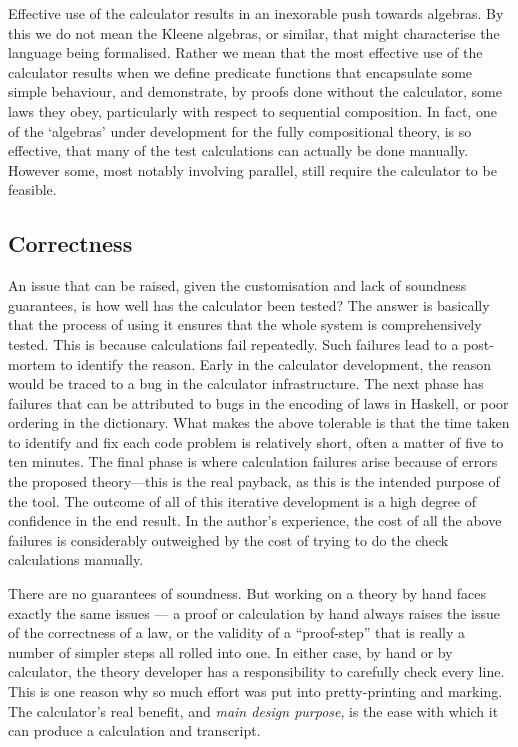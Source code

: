  


    Effective use of the calculator results in an inexorable
    push towards algebras. By this we do not mean the Kleene algebras,
    or similar, that might characterise the language being formalised.
    Rather we mean that the most effective use of the calculator results
    when we define predicate functions that encapsulate some simple
    behaviour, and demonstrate, by proofs done without the calculator,
    some laws they obey, 
    particularly with respect to sequential composition.
    In fact, one of the `algebras' under development for the fully
    compositional theory, is so effective, 
    that many of the test calculations
    can actually be done manually.
    However some, most notably involving parallel,
    still require the calculator to be feasible.

\subsection{Correctness}

    An issue that can be raised,
    given the customisation and lack of soundness guarantees,
    is how well has the calculator been tested?
    The answer is basically that the process of using it ensures
    that the whole system is comprehensively tested.
    This is because calculations fail repeatedly.
    Such failures lead to a post-mortem to identify the reason.
    Early in the calculator development,
    the reason would be traced to a bug in the calculator infrastructure.
    The next phase has failures that can be attributed
    to bugs in the encoding of laws in Haskell,
    or poor ordering in the dictionary.
    What makes the above tolerable is that the time taken to identify
    and fix each code problem is relatively short,
    often a matter of five to ten minutes.
    The final phase is where calculation failures arise because of errors
    the proposed theory---this is the real payback,
    as this is the intended purpose of the tool.
    The outcome of all of this iterative development
    is a high degree of confidence in the end result.
    In the author's experience,
    the cost of all the above failures
    is considerably outweighed by the cost of
    trying to do the check calculations manually.

There are no guarantees of soundness.
But working on a theory by hand faces exactly the same issues
--- a proof or calculation by hand always raises the issue
of the correctness of a law, or the validity of a ``proof-step''
that is really a number of simpler steps all rolled into one.
In either case, by hand or by calculator,
the theory developer has a responsibility to carefully check every line.
This is one reason why so much effort was put into pretty-printing
and marking.
The calculator's real benefit, and\emph{ main design purpose},
is the ease with which
it can produce a calculation and transcript.


